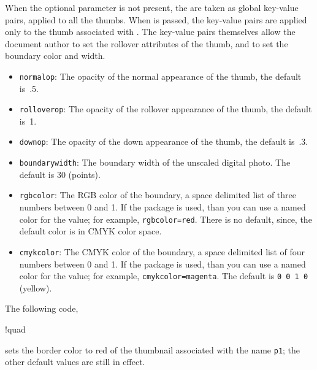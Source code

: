 \documentclass{article}
\begin{document}
\bVerb{}%
\begin{dCmd*}[commandchars=!()]{\bxSize}
\end{dCmd*}
\eVerb When the optional parameter  is not present, the
 are taken as global key-value pairs, applied to all the
thumbs. When  is passed, the key-value pairs are applied only to
the thumb associated with . The key-value pairs themselves allow
the document author to set the rollover attributes of the thumb, and to set
the boundary color and width.
\begin{itemize}
\item\texttt{normalop}: The opacity of the normal appearance of the thumb, the default
is~.5.
\item\texttt{rolloverop}: The opacity of the rollover appearance of the thumb, the default
is~1.
\item\texttt{downop}:  The opacity of the down appearance of the thumb, the default
is~.3.
\item\texttt{boundarywidth}: The boundary width of the unscaled digital photo. The
default is 30 (points).
\item\texttt{rgbcolor}: The RGB color of the boundary, a space delimited
    list of three numbers between 0 and 1. If the 
    package is used,
    than you can use a named color for the value; for example,
    \texttt{rgbcolor=red}. There is no default, since, the default color is
    in CMYK color space.
\item\texttt{cmykcolor}: The CMYK color of the boundary, a space delimited list of four numbers
between 0 and 1. If the 
    package is used,
    than you can use a named color for the value; for example,
    \texttt{cmykcolor=magenta}.
The default is \texttt{0 0 1 0} (yellow).
\end{itemize}
The following code,
\bVerb{}%
\begin{dCmd}[commandchars=!()]{\bxSize}
!quad%
\end{dCmd}
\eVerb
sets the border color to red of the thumbnail associated with the name \texttt{p1};
the other default values are still in effect.
\end{document}
